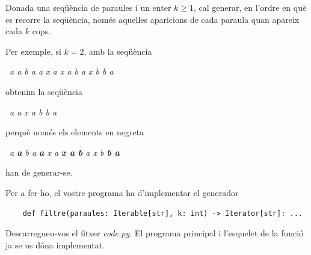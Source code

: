 
\UsePython

\Statement

Donada una seqüència de paraules i un enter $k\ge 1$, cal generar, en l'ordre en què es recorre la seqüència, només aquelles aparicions de cada paraula quan apareix cada $k$ cops. 

\newcommand{\ratlla}[1]{\underline{#1}}

\medskip
Per exemple, si $k=2$, amb la seqüència\smallskip

~{\qquad}\textit{a a b a a x a x a b a x b b a}\smallskip

obtenim la seqüència\smallskip

~{\qquad}\textit{a a x a b b a}\smallskip

perquè només els elements en negreta \smallskip

~{\qquad}\textit{a \textbf{a} b a \textbf{a} x a \textbf{x a b} a x b \textbf{b a}}\smallskip

han de generar-se.


\bigskip

Per a fer-ho, el vostre programa ha d'implementar el generador

\begin{lstlisting}
    def filtre(paraules: Iterable[str], k: int) -> Iterator[str]: ...
\end{lstlisting}

\medskip

Descarregueu-vos el fitxer \textit{code.py}. El programa principal i l'esquelet de la funció ja se us dóna implementat.

\Sample
